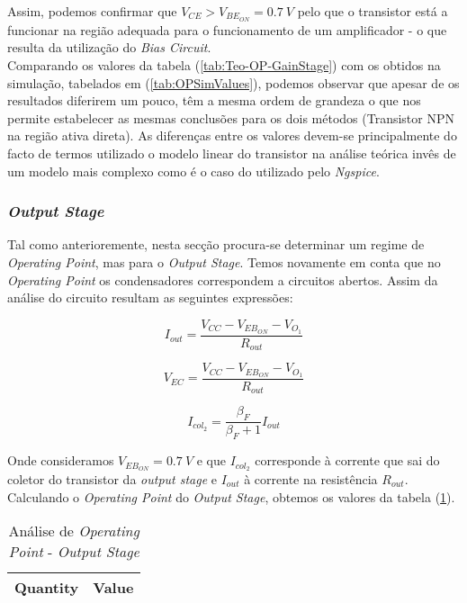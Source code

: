 Assim, podemos confirmar que $V_{CE} > V_{BE_{ON}} = 0.7 \: V$ pelo que o transistor está a funcionar na região adequada
para o funcionamento de um amplificador - o que resulta da utilização do \emph{Bias Circuit}.
\\
Comparando os valores da tabela (\ref{tab:Teo-OP-GainStage}) com os obtidos na simulação, tabelados em (\ref{tab:OPSimValues}),
podemos observar que apesar de os resultados diferirem um pouco, têm a mesma ordem de grandeza o que nos permite estabelecer
as mesmas conclusões para os dois métodos (Transistor NPN na região ativa direta). As diferenças entre os valores devem-se
principalmente do facto de termos utilizado o modelo linear do transistor na análise teórica invês de um modelo mais complexo como é o caso
do utilizado pelo \emph{Ngspice}.


\subsubsection{\emph{Output Stage}}

Tal como anterioremente, nesta secção procura-se determinar um regime de \emph{Operating Point}, mas para o \emph{Output
Stage}. Temos novamente em conta que no \emph{Operating Point} os condensadores correspondem a circuitos abertos.
Assim da análise do circuito resultam as seguintes expressões:

\begin{equation}
  I_{out} = \frac{V_{CC} - V_{EB_{ON}} - V_{O_1}}{R_{out}}
\end{equation}

\begin{equation}
  V_{EC} = \frac{V_{CC} - V_{EB_{ON}} - V_{O_1}}{R_{out}}
\end{equation}

\begin{equation}
  I_{col_2} = \frac{\beta_F}{\beta_F+1}  I_{out}
\end{equation}

Onde consideramos $V_{EB_{ON}} = 0.7 \: V$ e que $I_{col_2}$ corresponde à corrente que sai do coletor do transistor da \emph{output stage}
e $I_{out}$ à corrente na resistência $R_{out}$.
Calculando o \emph{Operating Point} do \emph{Output Stage}, obtemos os valores da tabela (\ref{tab:Teo-OP-OutputStage}).

\begin{table}[H]
    \centering
    \begin{tabular}{|l|r|}
    \hline
    {\bf Quantity} & {\bf Value} \\ \hline
    
    \end{tabular}
    \caption{Análise de \emph{Operating Point} - \emph{Output Stage}}
    \label{tab:Teo-OP-OutputStage}
\end{table}

